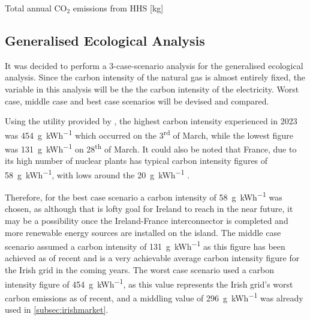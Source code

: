 \begin{table}[htb]
    \footnotesize
    \centering
    \caption{Total annual $\text{CO}_2$ emissions from \acs{HHS} [kg]}
    \label{tbl:annualheatingco2}
\end{table}


\subsection{Generalised Ecological Analysis}
It was decided to perform a 3-case-scenario analysis for the generalised ecological analysis. Since the carbon intensity of the natural gas is almost entirely fixed, the variable in this analysis will be the the carbon intensity of the electricity. Worst case, middle case and best case scenarios will be devised and compared. 

Using the  \cite{eirgrid_group_explore_2023} utility provided by \citeauthor{eirgrid_group_explore_2023}, the highest carbon intensity experienced in 2023 was \qty{454}{\gram\per\kWh} which occurred on the 3\textsuperscript{rd} of March, while the lowest figure was \qty{131}{\gram\per\kWh} on 28\textsuperscript{th} of March. It could also be noted that France, due to its high number of nuclear plants has typical carbon intensity figures of \qty{58}{\gram\per\kWh}, with lows around the \qty{20}{\gram\per\kWh} \cite{iea2019world}.

Therefore, for the best case scenario a carbon intensity of \qty{58}{\gram\per\kWh} was chosen, as although that is lofty goal for Ireland to reach in the near future, it may be a possibility once the Ireland-France interconnector is completed and more renewable energy sources are installed on the island. The middle case scenario assumed a carbon intensity of \qty{131}{\gram\per\kWh} as this figure has been achieved as of recent and is a very achievable average carbon intensity figure for the Irish grid in the coming years. The worst case scenario used a carbon intensity figure of \qty{454}{\gram\per\kWh}, as this value represents the Irish grid's worst carbon emissions as of recent, and a middling value of \qty{296}{\gram\per\kWh} was already used in \cref{subsec:irishmarket}.


